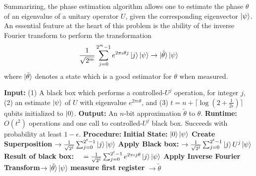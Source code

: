 Summarizing, the phase estimation algorithm allows one to estimate the phase $\theta$ of an eigenvalue of a unitary operator $U$, given the corresponding eigenvector $\ket{\psi}$. An essential feature at the heart of this problem is the ability of the inverse Fourier transform to perform the transformation
\[
\frac{1}{\sqrt{2^m}}\sum_{j=0}^{2^m-1} e^{2\pi\iota \theta j}\ket{j}\ket{\psi} \rightarrow \ket{\tilde{\theta}}\ket{\psi}
\]
where $\ket{\tilde{\theta}}$ denotes a state which is a good estimator for $\theta$ when measured.
\begin{algorithm}
    \caption{Quantum Phase Estimation}
    \begin{algorithmic}[1]
    \State \textbf{Input:} (1) A black box which performs a controlled-$U^j$ operation, for integer $j$, (2) an estimate $\ket{\psi}$ of $U$ with eigenvalue $e^{2\pi\iota \theta}$, and (3) $t=n+\lceil \log \left(2 + \frac{1}{2\epsilon}\right)\rceil$ qubits initialized to $\ket{0}$.
    \State \textbf{Output:} An $n$-bit approximation $\tilde{\theta}$ to $\theta$.
    \State \textbf{Runtime: }$O(t^2)$ operations and one call to controlled-$U^j$ black box. Succeeds with probability at least $1-\epsilon$.
    \State \textbf{Procedure: }
    \State \hspace{1em} \textbf{Initial State: }$\ket{0}\ket{\psi}$
    \State \hspace{1em} \textbf{Create Superposition} $\rightarrow \frac{1}{\sqrt{2^t}} \sum_{j=0}^{2^t-1} \ket{j}\ket{\psi}$
    \State \hspace{1em} \textbf{Apply Black box: }$\rightarrow \frac{1}{\sqrt{2^t}} \sum_{j=0}^{2^t-1} \ket{j}U^j\ket{\psi}$
    \State \hspace{1em} \textbf{Result of black box: }$\quad =\frac{1}{\sqrt{2^t}} \sum_{j=0}^{2^t-1} e^{2\pi\iota j \theta}\ket{j}\ket{\psi}$
    \State \hspace{1em} \textbf{Apply Inverse Fourier Transform}$\rightarrow \ket{\tilde{\theta}}\ket{\psi}$
    \State\hspace{1em} \textbf{measure first register} $\rightarrow \tilde{\theta}$
    \end{algorithmic}
\end{algorithm}



